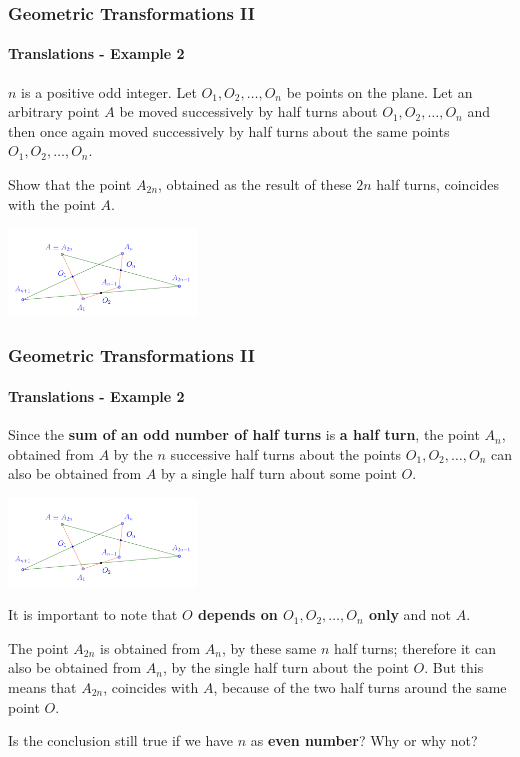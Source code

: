 \documentclass[8pt,xcolor=table,dvipsnames]{beamer}
\begin{document}
\begin{frame}[t]
    \frametitle{Geometric Transformations II}
    \framesubtitle{Translations - Example 2}
    \begin{example}
        $n$ is a positive odd integer. Let $O_1, O_2, \ldots, O_{n}$ be points on the plane.
        Let an arbitrary point $A$ be moved successively by half turns about $O_1, O_2, \ldots, O_{n}$
        and then once again moved successively by half turns about the same points $O_1, O_2, \ldots, O_{n}$.
        
        \bigbreak
        Show that the point $A_{2n}$, obtained as the result of these $2n$ half turns, coincides with the point $A.$
    \end{example}

    \begin{center}
        \includegraphics[width=5cm]{./svg/pdf/translation-2.pdf}
    \end{center}
\end{frame}

\begin{frame}[t]
    \frametitle{Geometric Transformations II}
    \framesubtitle{Translations - Example 2}
    Since the \textbf{sum of an odd number of half turns} is \textbf{a half turn}, the point $A_n$, obtained from $A$ by the $n$
    successive half turns about the points $O_1, O_2, \ldots, O_{n}$ can also be obtained from $A$ by a single half turn about some point $O$.
    \begin{center}
        \includegraphics[width=5cm]{./svg/pdf/translation-2.pdf}
    \end{center}

    It is important to note that \textbf{$O$ depends on $O_1, O_2, \ldots, O_{n}$ only} and not $A$.
    
    \bigbreak
    The point $A_{2n}$ is obtained from $A_n$, by these same $n$ half turns;
    therefore it can also be obtained from $A_n$, by the single half turn about the point $O$.
    But this means that $A_{2n}$, coincides with $A$, because of the two half turns around the same point $O$.

    \bigbreak
    Is the conclusion still true if we have $n$ as \textbf{even number}? Why or why not?
\end{frame}
\end{document}
